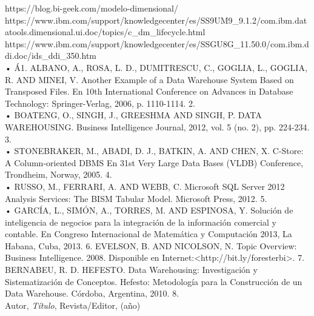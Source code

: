 \begin{thebibliography}{99}
https://blog.bi-geek.com/modelo-dimensional/\\
https://www.ibm.com/support/knowledgecenter/es/SS9UM9_9.1.2/com.ibm.datatools.dimensional.ui.doc/topics/c_dm_lifecycle.html\\
https://www.ibm.com/support/knowledgecenter/es/SSGU8G_11.50.0/com.ibm.ddi.doc/ids_ddi_350.htm\\
•	Á1.  ALBANO, A., ROSA, L. D., DUMITRESCU, C., GOGLIA, L., GOGLIA, R.  AND MINEI, V. Another Example of a Data Warehouse System Based on Transposed Files. En 10th International Conference on Advances in Database Technology: Springer-Verlag, 2006, p. 1110-1114. 2.\\
•	BOATENG, O., SINGH, J., GREESHMA AND SINGH, P. DATA WAREHOUSING. Business Intelligence Journal, 2012, vol. 5 (no. 2), pp. 224-234. 3. \\
•	STONEBRAKER, M., ABADI, D. J., BATKIN, A. AND CHEN, X.  C-Store: A Column-oriented DBMS En 31st Very Large Data Bases (VLDB) Conference, Trondheim, Norway, 2005. 4.\\
•	RUSSO, M., FERRARI, A.  AND WEBB, C. Microsoft SQL Server 2012 Analysis Services: The BISM Tabular Model. Microsoft Press, 2012. 5.\\ 
•	GARCÍA, L., SIMÓN, A., TORRES, M. AND ESPINOSA, Y. Solución de inteligencia de negocios para la integración de la información comercial y contable.  En Congreso Internacional de Matemática y Computación 2013, La Habana, Cuba, 2013. 6.  EVELSON, B. AND NICOLSON, N. Topic Overview: Business Intelligence.  2008. Disponible en Internet:<http://bit.ly/foresterbi>.  7.  BERNABEU, R. D. HEFESTO. Data Warehousing: Investigación y Sistematización de Conceptos. Hefesto: Metodología para la Construcción de un Data Warehouse. Córdoba, Argentina, 2010. 8.\\  


 Autor, \emph{Título}, Revista/Editor, (año)

\end{thebibliography}



